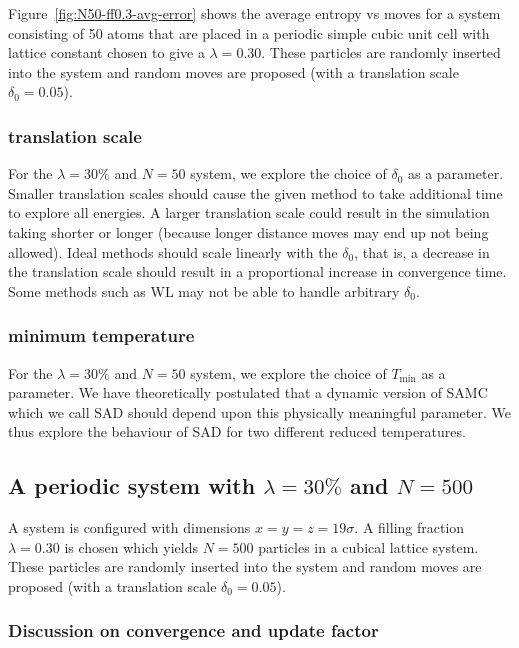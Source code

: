 \documentclass[letterpaper,twocolumn,amsmath,amssymb,pre,aps,10pt]{revtex4-1}
\begin{document}
Figure~\ref{fig:N50-ff0.3-avg-error} shows the average entropy vs moves for
a system consisting of 50 atoms that are placed in a periodic simple cubic unit
cell with lattice constant chosen to give a $\lambda = 0.30$.  These particles
are randomly inserted into the system and random moves are proposed (with
a translation scale $\delta_0 = 0.05$).

\subsubsection{translation scale}
For the $\lambda = 30\%$ and $N = 50$ system, we explore the choice of $\delta_0$
as a parameter. Smaller translation scales should cause the given method to take
additional time to explore all energies.  A larger translation scale could result
in the simulation taking shorter or longer (because longer distance moves may end up
not being allowed). Ideal methods should scale linearly with the $\delta_0$, that is,
a decrease in the translation scale should result in a proportional increase in convergence
time. Some methods such as WL may not be able to handle arbitrary $\delta_0$.

\subsubsection{minimum temperature}
For the $\lambda = 30\%$ and $N = 50$ system, we explore the choice of $T_{\min}$
as a parameter. We have theoretically postulated that a dynamic version of SAMC which
we call SAD should depend upon this physically meaningful parameter. We thus explore
the behaviour of SAD for two different reduced temperatures.

\subsection{A periodic system with $\lambda = 30\%$ and $N = 500$}

A system is configured with dimensions $x = y = z = 19\sigma$.  A
filling fraction $\lambda = 0.30$ is chosen which yields $N = 500$
particles in a cubical lattice system.  These particles are randomly inserted
into the system and random moves are proposed (with a translation scale
$\delta_0 = 0.05$).

\subsubsection{Discussion on convergence and update factor}
\end{document}
